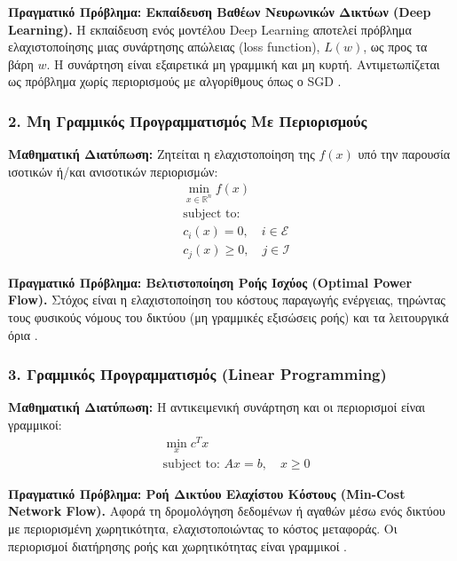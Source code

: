 \documentclass[a4paper,12pt]{article}
\begin{document}
\textbf{Πραγματικό Πρόβλημα: Εκπαίδευση Βαθέων Νευρωνικών Δικτύων (Deep Learning).}
Η εκπαίδευση ενός μοντέλου Deep Learning αποτελεί πρόβλημα ελαχιστοποίησης μιας συνάρτησης απώλειας (loss function), $L(w)$, ως προς τα βάρη $w$. Η συνάρτηση είναι εξαιρετικά μη γραμμική και μη κυρτή. Αντιμετωπίζεται ως πρόβλημα χωρίς περιορισμούς με αλγορίθμους όπως ο SGD \cite{goodfellow}.

\subsubsection*{2. Μη Γραμμικός Προγραμματισμός Με Περιορισμούς}
\textbf{Μαθηματική Διατύπωση:}
Ζητείται η ελαχιστοποίηση της $f(x)$ υπό την παρουσία ισοτικών ή/και ανισοτικών περιορισμών:
\begin{equation}
\begin{aligned}
& \min_{x \in \mathbb{R}^n} f(x) \\
& \text{subject to: } \\
& c_i(x) = 0, \quad i \in \mathcal{E} \\
& c_j(x) \geq 0, \quad j \in \mathcal{I}
\end{aligned}
\end{equation}

\textbf{Πραγματικό Πρόβλημα: Βελτιστοποίηση Ροής Ισχύος (Optimal Power Flow).}
Στόχος είναι η ελαχιστοποίηση του κόστους παραγωγής ενέργειας, τηρώντας τους φυσικούς νόμους του δικτύου (μη γραμμικές εξισώσεις ροής) και τα λειτουργικά όρια \cite{momoh}.

\subsubsection*{3. Γραμμικός Προγραμματισμός (Linear Programming)}
\textbf{Μαθηματική Διατύπωση:}
Η αντικειμενική συνάρτηση και οι περιορισμοί είναι γραμμικοί:
\begin{equation}
\begin{aligned}
& \min_{x} c^T x \\
& \text{subject to: } Ax = b, \quad x \geq 0
\end{aligned}
\end{equation}

\textbf{Πραγματικό Πρόβλημα: Ροή Δικτύου Ελαχίστου Κόστους (Min-Cost Network Flow).}
Αφορά τη δρομολόγηση δεδομένων ή αγαθών μέσω ενός δικτύου με περιορισμένη χωρητικότητα, ελαχιστοποιώντας το κόστος μεταφοράς. Οι περιορισμοί διατήρησης ροής και χωρητικότητας είναι γραμμικοί \cite{bertsimas}.
\end{document}
